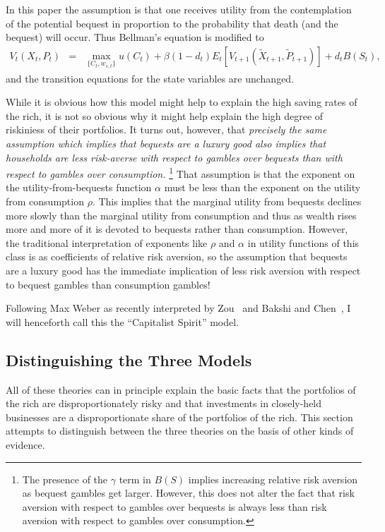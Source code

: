 \documentclass[12pt]{article}
\begin{document}
In this paper the assumption is that one receives utility from the
contemplation of the potential bequest in proportion to the probability that
death (and the bequest) will occur. Thus Bellman's equation is modified to 
\begin{eqnarray}
V_{t}(X_{t},P_{t}) & =& \max_{\{C_{t},w_{s,t}\}} u(C_{t}) + \beta (1-d_{t})
E_{t}\left[V_{t+1}(\tilde{X}_{t+1},\tilde{P}_{t+1}) \right] + d_{t} B(S_{t}),
\nonumber
\end{eqnarray}
and the transition equations for the state variables are unchanged.

While it is obvious how this model might help to explain the high saving
rates of the rich, it is not so obvious why it might help explain the high
degree of riskiniess of their portfolios. It turns out, however, that 
\textit{precisely the same assumption which implies that bequests are a
luxury good also implies that households are less risk-averse with respect
to gambles over bequests than with respect to gambles over consumption.}%
\footnote{%
The presence of the $\gamma$ term in $B(S)$ implies increasing relative risk
aversion as bequest gambles get larger. However, this does not alter the
fact that risk aversion with respect to gambles over bequests is always less
than risk aversion with respect to gambles over consumption.} That
assumption is that the exponent on the utility-from-bequests function $\alpha
$ must be less than the exponent on the utility from consumption $\rho$.
This implies that the marginal utility from bequests declines more slowly
than the marginal utility from consumption and thus as wealth rises more and
more of it is devoted to bequests rather than consumption. However, the
traditional interpretation of exponents like $\rho$ and $\alpha$ in utility
functions of this class is as coefficients of relative risk aversion, so the
assumption that bequests are a luxury good has the immediate implication of
less risk aversion with respect to bequest gambles than consumption gambles!

Following Max Weber as recently interpreted by Zou~\cite{zou:spirit} and
Bakshi and Chen~\cite{bakshi&chen:spirit}, I will henceforth call this the
``Capitalist Spirit'' model.

\subsection{Distinguishing the Three Models}

All of these theories can in principle explain the basic facts that the
portfolios of the rich are disproportionately risky and that investments in
closely-held businesses are a disproportionate share of the portfolios of
the rich. This section attempts to distinguish between the three theories on
the basis of other kinds of evidence.
\end{document}
